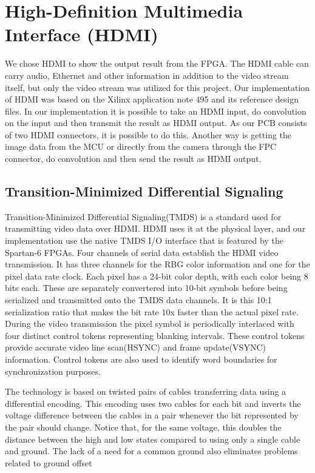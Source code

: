 \section{High-Definition Multimedia Interface (HDMI)}
We chose HDMI to show the output result from the FPGA.
The HDMI cable can carry audio, Ethernet and other information in addition to the video stream itself, but only the video stream was utilized for this project.
Our implementation of HDMI was based on the Xilinx application note 495\cite{xapp495} and its reference design files.
In our implementation it is possible to take an HDMI input, do convolution on the input and then transmit the result as HDMI output.
As our PCB consists of two HDMI connectors, it is possible to do this.
Another way is getting the image data from the MCU or directly from the camera through the FPC connector, do convolution and then send the result as HDMI output.

\subsection{Transition-Minimized Differential Signaling}
Transition-Minimized Differential Signaling(TMDS) is a standard used for transmitting video data over HDMI.
HDMI uses it at the physical layer, and our implementation use the native TMDS I/O interface that is featured by the Spartan-6 FPGAs.
Four channels of serial data establish the HDMI video transmission.
It has three channels for the RBG color information and one for the pixel data rate clock.
Each pixel has a 24-bit color depth, with each color being 8 bits each.
These are separately convertered into 10-bit symbols before being serialized and transmitted onto the TMDS data channels.
It is this 10:1 serialization ratio that makes the bit rate 10x faster than the actual pixel rate.
During the video transmission the pixel symbol is periodically interlaced with four distinct control tokens representing blanking intervals.
These control tokens provide accurate video line scan(HSYNC) and frame update(VSYNC) information.
Control tokens are also used to identify word boundaries for synchronization purposes.

The technology is based on twisted pairs of cables transferring data using a differential encoding.
This encoding uses two cables for each bit and inverts the voltage difference between the cables in a pair whenever the bit represented by the pair should change.
Notice that, for the same voltage, this doubles the distance between the high and low states compared to using only a single cable and ground.
The lack of a need for a common ground also eliminates problems related to ground offset


